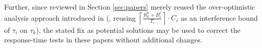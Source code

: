 Further, since \cite{zeng-2011,bbb-2013,yang-2013,kim-2014,han-2014,carminati-2014,yang-2014} reviewed in Section \ref{sec:papers} merely reused the over-optimistic analysis approach introduced in \cite{lakshmanan-2009} (\ie, reusing $\left \lceil \frac{R_k^n + B_i^r}{T_i} \right \rceil \cdot C_i$ as an interference bound of $\tau_i$ on $\tau_k$), the stated fix as potential solutions may be used to correct the response-time tests in these papers without additional changes.


  
  




  
